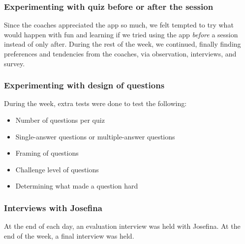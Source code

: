 \subsubsection{Experimenting with quiz before or after the session}
Since the coaches appreciated the app so much, we felt tempted to try what would happen with fun and learning if we tried using the app \textit{before} a session instead of only after. During the rest of the week, we continued, finally finding preferences and tendencies from the coaches, via observation, interviews, and survey.

\subsubsection{Experimenting with design of questions}
During the week, extra tests were done to test the following:

\begin{itemize}
\item Number of questions per quiz
\item Single-answer questions or multiple-answer questions
\item Framing of questions
\item Challenge level of questions
\item Determining what made a question hard
\end{itemize}

\subsubsection{Interviews with Josefina}
At the end of each day, an evaluation interview was held with Josefina. At the end of the week, a final interview was held.
